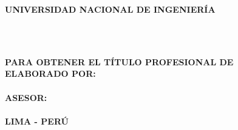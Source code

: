 \begin{titlepage}
	
	\begin{center}
		\vspace*{2 mm}
		{\LARGE \textbf{UNIVERSIDAD NACIONAL DE INGENIERÍA}}\\
		\vspace{5 mm}
		{\LARGE \textbf{\@facultad}}\\
		\vspace{6.5 mm}
		\begin{figure}[h]
			\centering 
			
		\end{figure}
		\vspace{5 mm}	
		
		\onehalfspacing  %
		{\Large \textbf{{\@titlecaratula}} }\\
		
		\singlespacing  %
		
		\vspace{5 mm}	
		{\large \textbf{PARA OBTENER EL TÍTULO PROFESIONAL DE {\@grado} } }\\
		\vspace{10 mm}
		{\large \textbf{ELABORADO POR:} }\\
		\vspace{5 mm}	
		{\large \textbf{\@authorcaratula} }\\
		\vspace{10 mm}
		{\large \textbf{ASESOR:} }\\
		\vspace{5 mm}	
		{\large \textbf{\@asesor} }\\
		\vspace{10 mm}	
		{\large \textbf{LIMA - PERÚ} }\\
		\vspace{5 mm}	
		{\large \textbf{\@yyearr} }\\

	\end{center}

\end{titlepage}